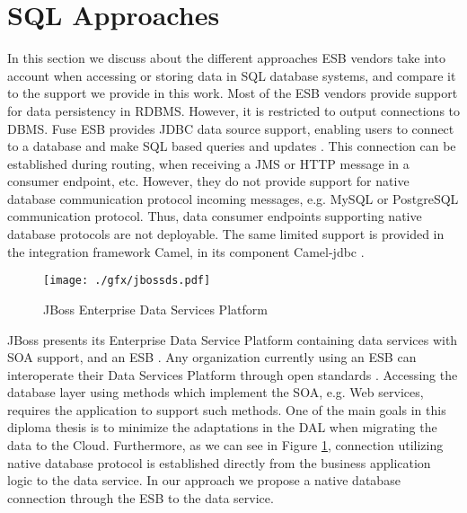 \section{SQL Approaches}
\label{sec:relatedworkssql}

In this section we discuss about the different approaches \ac{ESB} vendors take into account when accessing or storing data in \ac{SQL} database systems, and compare it to the support we provide in this work. 
Most of the \ac{ESB} vendors provide support for data persistency in \ac{RDBMS}. However, it is restricted to output connections to \ac{DBMS}. Fuse \ac{ESB} provides \ac{JDBC} data source support, enabling users to connect to a database and make \ac{SQL} based queries and updates \cite{FuseIntro}. This connection can be established during routing, when receiving a JMS or HTTP message in a consumer endpoint, etc. However, they do not provide support for native database communication protocol incoming messages, e.g. MySQL or PostgreSQL communication protocol. Thus, data consumer endpoints supporting native database protocols are not deployable. The same limited support is provided in the integration framework Camel, in its component Camel-jdbc \cite{cameljdbc}.

 \begin{figure}[htb]
	\centering
		\texttt{[image: ./gfx/jbossds.pdf]}
	\caption[JBoss SOA and Data Services Integration]{JBoss Enterprise Data Services Platform \cite{jboss2011}}
	\label{fig:jbossdataservice}
\end{figure}

JBoss presents its Enterprise Data Service Platform containing data services with \ac{SOA} support, and an \ac{ESB} \cite{jboss2011}. Any organization currently using an \ac{ESB} can interoperate their Data Services Platform through open standards \cite{jboss2011}. Accessing the database layer using methods which implement the \ac{SOA}, e.g. Web services, requires the application to support such methods. One of the main goals in this diploma thesis is to minimize the adaptations in the DAL when migrating the data to the Cloud. Furthermore, as we can see in Figure \ref{fig:jbossdataservice}, connection utilizing native database protocol is established directly from the business application logic to the data service. In our approach we propose a native database connection through the \ac{ESB} to the data service. 